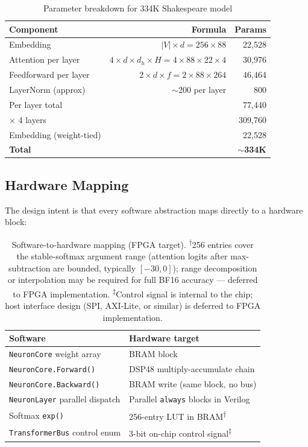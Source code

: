 \documentclass[11pt]{article}
\begin{document}
\begin{table}[ht]
\centering
\begin{tabular}{lrr}
\toprule
Component & Formula & Params \\
\midrule
Embedding & $|V| \times d = 256 \times 88$ & 22,528 \\
Attention per layer & $4 \times d \times d_h \times H = 4 \times 88 \times 22 \times 4$ & 30,976 \\
Feedforward per layer & $2 \times d \times f = 2 \times 88 \times 264$ & 46,464 \\
LayerNorm (approx) & $\sim$200 per layer & 800 \\
\midrule
Per layer total & & 77,440 \\
$\times$ 4 layers & & 309,760 \\
Embedding (weight-tied) & & 22,528 \\
\midrule
\textbf{Total} & & \textbf{$\sim$334K} \\
\bottomrule
\end{tabular}
\caption{Parameter breakdown for 334K Shakespeare model}
\label{tab:param-breakdown}
\end{table}

\subsection{Hardware Mapping}

The design intent is that every software abstraction maps directly to a hardware block:

\begin{table}[ht]
\centering
\begin{tabular}{ll}
\toprule
Software & Hardware target \\
\midrule
\texttt{NeuronCore} weight array & BRAM block \\
\texttt{NeuronCore.Forward()} & DSP48 multiply-accumulate chain \\
\texttt{NeuronCore.Backward()} & BRAM write (same block, no bus) \\
\texttt{NeuronLayer} parallel dispatch & Parallel \texttt{always} blocks in Verilog \\
Softmax \texttt{exp()} & 256-entry LUT in BRAM\textsuperscript{$\dagger$} \\
\texttt{TransformerBus} control enum & 3-bit on-chip control signal\textsuperscript{$\ddagger$} \\
\bottomrule
\end{tabular}
\caption{Software-to-hardware mapping (FPGA target).
\textsuperscript{$\dagger$}256 entries cover the stable-softmax argument range (attention logits after max-subtraction are bounded, typically $[-30, 0]$); range decomposition or interpolation may be required for full BF16 accuracy --- deferred to FPGA implementation.
\textsuperscript{$\ddagger$}Control signal is internal to the chip; host interface design (SPI, AXI-Lite, or similar) is deferred to FPGA implementation.}
\end{table}
\end{document}
